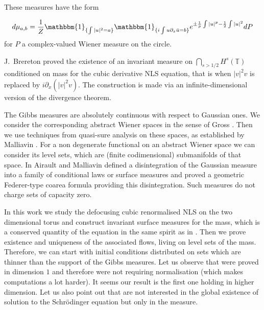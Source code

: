 \documentclass[11pt,leqno]{amsart}
\newcommand{\T}{\mathbb{T}}
\begin{document}
These measures have the form

$$d\mu_{a,b} =\frac{1}{Z} \mathbbm{1}_{\{\int |u|^2 =a\}}\mathbbm{1}_{\{i\int u\partial_x \bar u =b \}}e^{\pm \frac{1}{p} \int |u|^p -\frac{1}{2} \int |u|^2 }dP$$
for $P$ a complex-valued Wiener measure on the circle.

J.~Brereton \cite{MR3900225}   proved the existence of an invariant measure on $\bigcap_{s>1/2} H^s(\T)$ conditioned on mass for the cubic derivative NLS equation, that is when $|v|^{2} v$
is replaced by $i \partial_x(|v|^2 v)$. The construction is made via an infinite-dimensional version of the divergence theorem.


The Gibbs measures are absolutely continuous with respect to Gaussian ones. We consider the corresponding abstract Wiener spaces in the sense of Gross \cite{G}. 
Then we use techniques from quasi-sure analysis on these spaces, as established by Malliavin \cite{M}. For a non degenerate functional on an abstract Wiener space we can 
consider its level sets, which are (finite codimensional) submanifolds of that space. In \cite{AM} Airault and Malliavin defined a disintegration of the Gaussian measure
 into a family of conditional laws or surface measures and proved  a geometric Federer-type coarea formula providing  this disintegration.
Such measures do not charge sets of capacity zero.



 In this work we study the defocusing cubic renormalised NLS on the two dimensional torus and construct invariant surface measures for the mass, 
which is a conserved quantity of the equation in the same spirit as in \cite{B96,OQ}. Then we prove existence and uniqueness of the associated flows, living on  level sets of the mass. Therefore, we can start with initial conditions distributed on sets which are thinner than the support of the Gibbs measures. Let us observe that \cite{B96,OQ} were proved in dimension $1$ and therefore were not requiring normalisation (which makes computations a lot harder). It seems our result is the first one holding in higher dimension. Let us also point out that \cite{B96,OQ} are not interested in the global existence of solution to the Schr\" odinger equation but only in the measure.  





\end{document}
